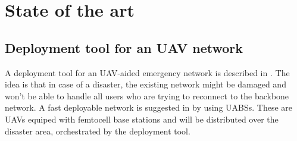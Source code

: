 \chapter{State of the art}
\label{chap:stateoftheart}

\section{Deployment tool for an UAV network}
\label{chap:stateoftheart:deploymenttool}


A deployment tool for an UAV-aided emergency network is described in \cite{J2}. The idea is that in case of a disaster, the existing network might be damaged and won't be able 
to handle all users who are trying to reconnect to the backbone network. A fast deployable network is suggested in \cite{J2} by using \gls{UABS}s. These are UAVs equiped with femtocell base stations
and will be distributed over the disaster area, orchestrated by the deployment tool. 


